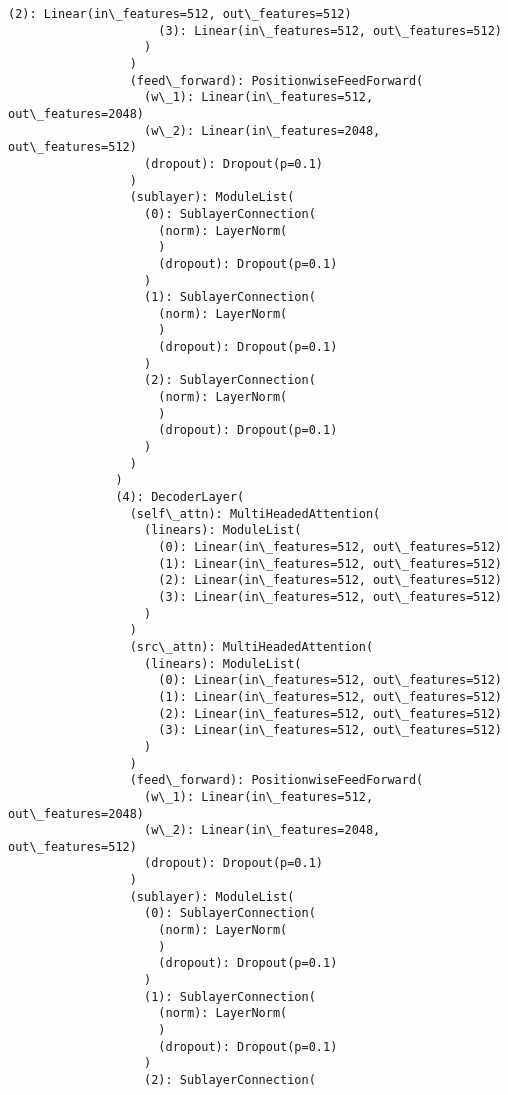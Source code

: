 \documentclass[11pt]{article}
\begin{document}
\begin{Verbatim}[commandchars=\\\{\}]
                     (2): Linear(in\_features=512, out\_features=512)
                     (3): Linear(in\_features=512, out\_features=512)
                   )
                 )
                 (feed\_forward): PositionwiseFeedForward(
                   (w\_1): Linear(in\_features=512, out\_features=2048)
                   (w\_2): Linear(in\_features=2048, out\_features=512)
                   (dropout): Dropout(p=0.1)
                 )
                 (sublayer): ModuleList(
                   (0): SublayerConnection(
                     (norm): LayerNorm(
                     )
                     (dropout): Dropout(p=0.1)
                   )
                   (1): SublayerConnection(
                     (norm): LayerNorm(
                     )
                     (dropout): Dropout(p=0.1)
                   )
                   (2): SublayerConnection(
                     (norm): LayerNorm(
                     )
                     (dropout): Dropout(p=0.1)
                   )
                 )
               )
               (4): DecoderLayer(
                 (self\_attn): MultiHeadedAttention(
                   (linears): ModuleList(
                     (0): Linear(in\_features=512, out\_features=512)
                     (1): Linear(in\_features=512, out\_features=512)
                     (2): Linear(in\_features=512, out\_features=512)
                     (3): Linear(in\_features=512, out\_features=512)
                   )
                 )
                 (src\_attn): MultiHeadedAttention(
                   (linears): ModuleList(
                     (0): Linear(in\_features=512, out\_features=512)
                     (1): Linear(in\_features=512, out\_features=512)
                     (2): Linear(in\_features=512, out\_features=512)
                     (3): Linear(in\_features=512, out\_features=512)
                   )
                 )
                 (feed\_forward): PositionwiseFeedForward(
                   (w\_1): Linear(in\_features=512, out\_features=2048)
                   (w\_2): Linear(in\_features=2048, out\_features=512)
                   (dropout): Dropout(p=0.1)
                 )
                 (sublayer): ModuleList(
                   (0): SublayerConnection(
                     (norm): LayerNorm(
                     )
                     (dropout): Dropout(p=0.1)
                   )
                   (1): SublayerConnection(
                     (norm): LayerNorm(
                     )
                     (dropout): Dropout(p=0.1)
                   )
                   (2): SublayerConnection(

\end{Verbatim}
\end{document}
